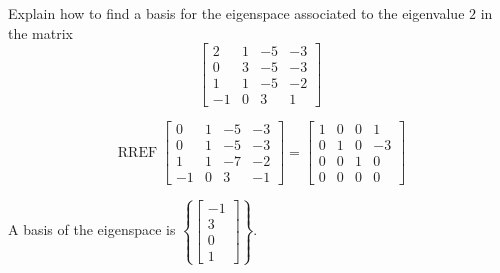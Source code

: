 
\begin{exerciseStatement}


Explain how to find a basis for the eigenspace associated to the eigenvalue \( 2 \) in the matrix \[ \left[\begin{array}{cccc}
2 & 1 & -5 & -3 \\
0 & 3 & -5 & -3 \\
1 & 1 & -5 & -2 \\
-1 & 0 & 3 & 1
\end{array}\right] \]


\end{exerciseStatement}
    
\begin{exerciseAnswer} 


\[\operatorname{RREF} \left[\begin{array}{cccc}
0 & 1 & -5 & -3 \\
0 & 1 & -5 & -3 \\
1 & 1 & -7 & -2 \\
-1 & 0 & 3 & -1
\end{array}\right] = \left[\begin{array}{cccc}
1 & 0 & 0 & 1 \\
0 & 1 & 0 & -3 \\
0 & 0 & 1 & 0 \\
0 & 0 & 0 & 0
\end{array}\right] \]



A basis of the eigenspace is \( \left\{ \left[\begin{array}{c}
-1 \\
3 \\
0 \\
1
\end{array}\right] \right\} \).


\end{exerciseAnswer}
    
